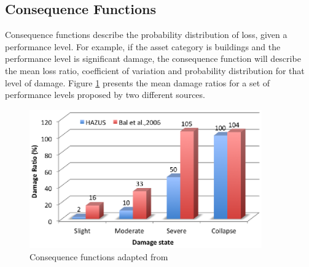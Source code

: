 \subsection{Consequence Functions}
Consequence functions describe the probability distribution of loss, given a performance level. For example, if the asset category is buildings and the performance level is significant damage, the consequence function will describe the mean loss ratio, coefficient of variation and probability distribution for that level of damage. Figure \ref{fig:ConsequenceFunctions} presents the mean damage ratios for a set of performance levels proposed by two different sources. 

\begin{figure}[ht]
\centering
\includegraphics[width=10cm,height=6cm]{./Figures/Part_Risk/ConsequenceFunction.eps}
\caption{Consequence functions adapted from  \citet{Baletal2010}}
\label{fig:ConsequenceFunctions}
\end{figure}

